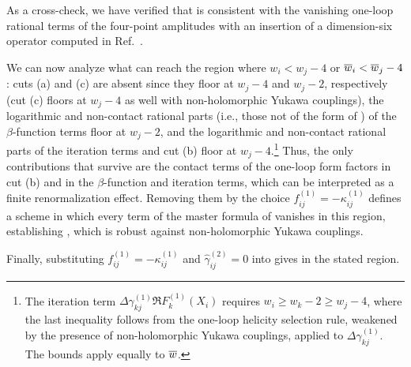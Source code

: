 \begin{subappendices}
As a cross-check, we have verified that  is consistent with the vanishing one-loop rational terms of the four-point amplitudes with an insertion of a dimension-six operator computed in Ref.~\cite{Craig:2019wmo}.

We can now analyze what can reach the region where $w_i < w_j - 4$ or $\overline{w}_i < \overline{w}_j - 4$: cuts (a)
and (c) are absent since they floor at $w_j - 4$ and $w_j-2$, respectively (cut (c) floors at $w_j - 4$ as well with non-holomorphic Yukawa couplings),
the logarithmic and non-contact rational parts (i.e., those not of the form of ) of
the $\beta$-function terms floor at $w_j - 2$, and the logarithmic and
non-contact rational parts of the iteration terms and cut (b) floor at $w_j - 4$.\footnote{The iteration term $\Delta\gamma^{(1)}_{kj}\Re F^{(1)}_k(X_i)$ requires $w_i \ge w_k - 2 \ge w_j - 4$, where the last inequality follows from the one-loop helicity selection rule, weakened by the presence of non-holomorphic Yukawa couplings, applied to $\Delta\gamma^{(1)}_{kj}$. The bounds apply equally to $\overline{w}$.}
Thus, the only contributions that survive are
the contact terms of the one-loop form factors in cut (b)
and in the $\beta$-function and iteration terms, which can be interpreted as a finite renormalization effect.
Removing them by the choice $f^{(1)}_{ij} = - \kappa^{(1)}_{ij}$ defines a scheme
in which every term of the master formula of  vanishes in this region, establishing
, which is robust against non-holomorphic Yukawa couplings.

Finally, substituting $f_{ij}^{(1)}=-\kappa_{ij}^{(1)}$ and $\widehat\gamma^{(2)}_{ij}=0$ into
 gives  in the stated region.

\end{subappendices}
